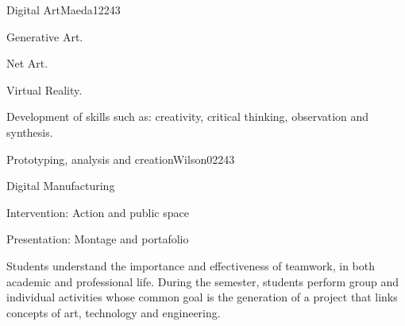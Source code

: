 \begin{syllabus}
\begin{unit}{Digital Art}{}{Maeda12}{24}{3}
   \begin{topics}
      \item Generative Art.
      \item Net Art.
      \item Virtual Reality.
   \end{topics}

   \begin{learningoutcomes}
      \item Development of skills such as: creativity, critical thinking, observation and synthesis.
      \end{learningoutcomes}
\end{unit}

\begin{unit}{Prototyping, analysis and creation}{}{Wilson02}{24}{3}
   \begin{topics}
      \item Digital Manufacturing
      \item Intervention: Action and public space
      \item Presentation: Montage and portafolio
      \end{topics}

   \begin{learningoutcomes}
      \item Students understand the importance and effectiveness of teamwork, in both academic and professional life. During the semester, students perform group and individual activities whose common goal is the generation of a project that links concepts of art,
           technology and engineering.
     
   \end{learningoutcomes}
\end{unit}

\begin{coursebibliography}
\end{coursebibliography}
\end{syllabus}
